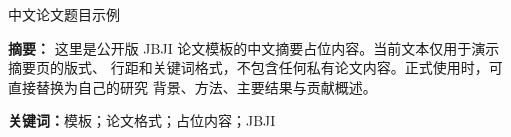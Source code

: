 \thispagestyle{plain}

{
  \centering\jnuthssAbstractTitleFont 中文论文题目示例\par
  \vspace{\jnuthssAbstractTitleInnerGap}
}

\vspace{\jnuthssAbstractBodyTopSpace}
\vspace{\jnuthssAbstractCNBodyExtraTopSpace}

{\jnuthssAbstractBodyStyle\noindent\textbf{摘要：}
这里是公开版 JBJI 论文模板的中文摘要占位内容。当前文本仅用于演示摘要页的版式、
行距和关键词格式，不包含任何私有论文内容。正式使用时，可直接替换为自己的研究
背景、方法、主要结果与贡献概述。
}

\vspace{\jnuthssAbstractKeywordsTopSpace}

{\jnuthssAbstractBodyStyle\noindent\textbf{关键词：}模板；论文格式；占位内容；JBJI}

